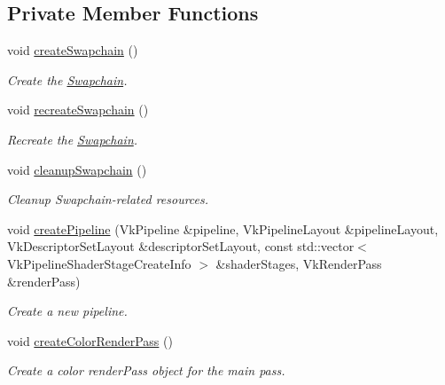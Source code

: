 \subsection*{Private Member Functions}
\begin{DoxyCompactItemize}
\item 
\mbox{\label{class_render_system_a198495772c148ec0fc5319a36721c62b}} 
void \mbox{\hyperlink{class_render_system_a198495772c148ec0fc5319a36721c62b}{create\+Swapchain}} ()
\begin{DoxyCompactList}\small\item\em Create the \mbox{\hyperlink{class_swapchain}{Swapchain}}. \end{DoxyCompactList}\item 
void \mbox{\hyperlink{class_render_system_ab24aff4914313ebaa5d87633d2126b6d}{recreate\+Swapchain}} ()
\begin{DoxyCompactList}\small\item\em Recreate the \mbox{\hyperlink{class_swapchain}{Swapchain}}. \end{DoxyCompactList}\item 
\mbox{\label{class_render_system_a71c200cab1427a7555fc5020337268be}} 
void \mbox{\hyperlink{class_render_system_a71c200cab1427a7555fc5020337268be}{cleanup\+Swapchain}} ()
\begin{DoxyCompactList}\small\item\em Cleanup Swapchain-\/related resources. \end{DoxyCompactList}\item 
void \mbox{\hyperlink{class_render_system_abe1ab5e58172135660b534f2de54daee}{create\+Pipeline}} (Vk\+Pipeline \&pipeline, Vk\+Pipeline\+Layout \&pipeline\+Layout, Vk\+Descriptor\+Set\+Layout \&descriptor\+Set\+Layout, const std\+::vector$<$ Vk\+Pipeline\+Shader\+Stage\+Create\+Info $>$ \&shader\+Stages, Vk\+Render\+Pass \&render\+Pass)
\begin{DoxyCompactList}\small\item\em Create a new pipeline. \end{DoxyCompactList}\item 
\mbox{\label{class_render_system_af4da98602d449e23fefeac3373f44d0c}} 
void \mbox{\hyperlink{class_render_system_af4da98602d449e23fefeac3373f44d0c}{create\+Color\+Render\+Pass}} ()
\begin{DoxyCompactList}\small\item\em Create a color render\+Pass object for the main pass. \end{DoxyCompactList}\item 

\end{DoxyCompactItemize}
